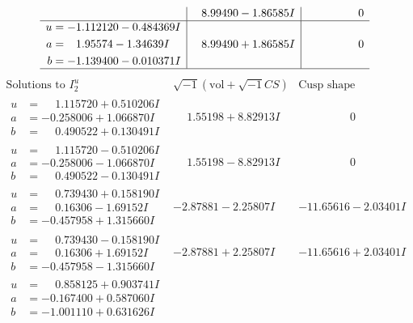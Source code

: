 \documentclass[1p]{elsarticle_modified}
\theoremstyle{definition}
\newcommand{\I}{\sqrt{-1}}
\begin{document}
$$\begin{array}{c|c|c}
 & \phantom{-}8.99490 - 1.86585 I & \phantom{-0.000000 } 0 \\ \hline\begin{aligned}
u &= -1.112120 - 0.484369 I \\
a &= \phantom{-}1.95574 - 1.34639 I \\
b &= -1.139400 - 0.010371 I\end{aligned}
 & \phantom{-}8.99490 + 1.86585 I & \phantom{-0.000000 } 0\\
 \hline 
 \end{array}$$\newpage$$\begin{array}{c|c|c}  
\text{Solutions to }I^u_{2}& \I (\text{vol} + \sqrt{-1}CS) & \text{Cusp shape}\\
 \hline 
\begin{aligned}
u &= \phantom{-}1.115720 + 0.510206 I \\
a &= -0.258006 + 1.066870 I \\
b &= \phantom{-}0.490522 + 0.130491 I\end{aligned}
 & \phantom{-}1.55198 + 8.82913 I & \phantom{-0.000000 } 0 \\ \hline\begin{aligned}
u &= \phantom{-}1.115720 - 0.510206 I \\
a &= -0.258006 - 1.066870 I \\
b &= \phantom{-}0.490522 - 0.130491 I\end{aligned}
 & \phantom{-}1.55198 - 8.82913 I & \phantom{-0.000000 } 0 \\ \hline\begin{aligned}
u &= \phantom{-}0.739430 + 0.158190 I \\
a &= \phantom{-}0.16306 - 1.69152 I \\
b &= -0.457958 + 1.315660 I\end{aligned}
 & -2.87881 - 2.25807 I & -11.65616 - 2.03401 I \\ \hline\begin{aligned}
u &= \phantom{-}0.739430 - 0.158190 I \\
a &= \phantom{-}0.16306 + 1.69152 I \\
b &= -0.457958 - 1.315660 I\end{aligned}
 & -2.87881 + 2.25807 I & -11.65616 + 2.03401 I \\ \hline\begin{aligned}
u &= \phantom{-}0.858125 + 0.903741 I \\
a &= -0.167400 + 0.587060 I \\
b &= -1.001110 + 0.631626 I\end{aligned}

\end{array}$$
\end{document}
